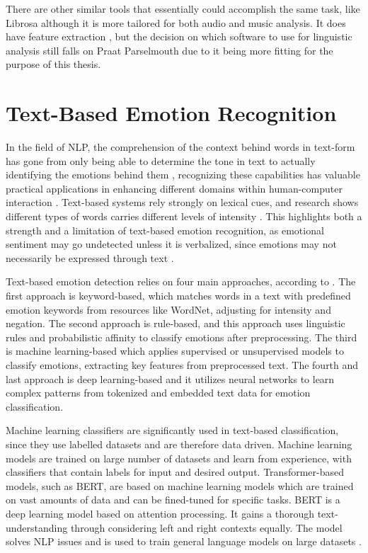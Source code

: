 There are other similar tools that essentially could accomplish the same task, like Librosa although it is more tailored for both audio and music analysis. It does have feature extraction \autocite{Babu2021}, but the decision on which software to use for linguistic analysis still falls on Praat Parselmouth due to it being more fitting for the purpose of this thesis.

\section{Text-Based Emotion Recognition}
In the field of NLP, the comprehension of the context behind words in text-form has gone from only being able to determine the tone in text to actually identifying the emotions behind them \autocite{Esfahani2024}, recognizing these capabilities has valuable practical applications in enhancing different domains within human-computer interaction \autocite{Shelke2022}. 
Text-based systems rely strongly on lexical cues, and research shows different types of words carries different levels of intensity \autocite{Chauhan2024}. This highlights both a strength and a limitation of text-based emotion recognition, as emotional sentiment may go undetected unless it is verbalized, since emotions may not necessarily be expressed through text \autocite{Soleymani2017}.

Text-based emotion detection relies on four main approaches, according to \textcite{Kusal2023}.
The first approach is keyword-based, which matches words in a text with predefined emotion keywords from resources like WordNet, adjusting for intensity and negation. The second approach is rule-based, and this approach uses linguistic rules and probabilistic affinity to classify emotions after preprocessing. The third is machine learning-based which applies supervised or unsupervised models to classify emotions, extracting key features from preprocessed text. The fourth and last approach is deep learning-based and it utilizes neural networks to learn complex patterns from tokenized and embedded text data for emotion classification.

Machine learning classifiers are significantly used in text-based classification, since they use labelled datasets and are therefore data driven. Machine learning models are trained on large number of datasets and learn from experience, with classifiers that contain labels for input and desired output. Transformer-based models, such as BERT, are based on machine learning models which are trained on vast amounts of data and can be fined-tuned for specific tasks. BERT is a deep learning model based on attention processing. It gains a thorough text-understanding through considering left and right contexts equally. The model solves NLP issues and is used to train general language models on large datasets \autocite{Kusal2024}.


